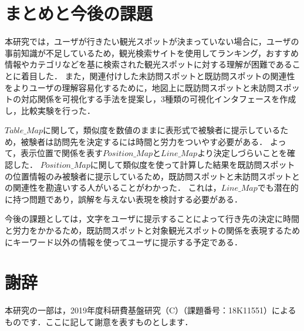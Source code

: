 \documentclass{deimj}
\begin{document}
\section{まとめと今後の課題}
\label{sec:まとめと今後の課題}

本研究では，ユーザが行きたい観光スポットが決まっていない場合に，ユーザの事前知識が不足しているため，観光検索サイトを使用してランキング，おすすめ情報やカテゴリなどを基に検索された観光スポットに対する理解が困難であることに着目した．
また，関連付けした未訪問スポットと既訪問スポットの関連性をよりユーザの理解容易化するために，地図上に既訪問スポットと未訪問スポットの対応関係を可視化する手法を提案し，3種類の可視化インタフェースを作成し，比較実験を行った．

$Table\_Map$に関して，類似度を数値のままに表形式で被験者に提示しているため，被験者は訪問先を決定するには時間と労力をついやす必要がある．
よって，表示位置で関係を表す$Position\_Map$と$Line\_Map$より決定しづらいことを確認した．
$Position\_Map$に関して類似度を使って計算した結果を既訪問スポットの位置情報のみ被験者に提示しているため，既訪問スポットと未訪問スポットとの関連性を勘違いする人がいることがわかった．
これは，$Line\_Map$でも潜在的に持つ問題であり，誤解を与えない表現を検討する必要がある．

今後の課題としては，文字をユーザに提示することによって行き先の決定に時間と労力をかかるため，既訪問スポットと対象観光スポットの関係を表現するためにキーワード以外の情報を使ってユーザに提示する予定である．

\section*{謝辞}
本研究の一部は，2019年度科研費基盤研究（C）（課題番号：18K11551）によるものです．ここに記して謝意を表すものとします．

\vspace{2em}

% 
% 
\end{document}
